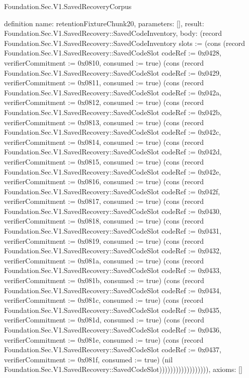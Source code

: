 \begin{lexlean}{Foundation.Sec.V1.SavedRecoveryCorpus}
\begin{semanticmodule}
definition{
  name: retentionFixtureChunk20,
  parameters: [],
  result: Foundation.Sec.V1.SavedRecovery::SavedCodeInventory,
  body: (record Foundation.Sec.V1.SavedRecovery::SavedCodeInventory {slots := (cons (record Foundation.Sec.V1.SavedRecovery::SavedCodeSlot {codeRef := 0x0428, verifierCommitment := 0x0810, consumed := true}) (cons (record Foundation.Sec.V1.SavedRecovery::SavedCodeSlot {codeRef := 0x0429, verifierCommitment := 0x0811, consumed := true}) (cons (record Foundation.Sec.V1.SavedRecovery::SavedCodeSlot {codeRef := 0x042a, verifierCommitment := 0x0812, consumed := true}) (cons (record Foundation.Sec.V1.SavedRecovery::SavedCodeSlot {codeRef := 0x042b, verifierCommitment := 0x0813, consumed := true}) (cons (record Foundation.Sec.V1.SavedRecovery::SavedCodeSlot {codeRef := 0x042c, verifierCommitment := 0x0814, consumed := true}) (cons (record Foundation.Sec.V1.SavedRecovery::SavedCodeSlot {codeRef := 0x042d, verifierCommitment := 0x0815, consumed := true}) (cons (record Foundation.Sec.V1.SavedRecovery::SavedCodeSlot {codeRef := 0x042e, verifierCommitment := 0x0816, consumed := true}) (cons (record Foundation.Sec.V1.SavedRecovery::SavedCodeSlot {codeRef := 0x042f, verifierCommitment := 0x0817, consumed := true}) (cons (record Foundation.Sec.V1.SavedRecovery::SavedCodeSlot {codeRef := 0x0430, verifierCommitment := 0x0818, consumed := true}) (cons (record Foundation.Sec.V1.SavedRecovery::SavedCodeSlot {codeRef := 0x0431, verifierCommitment := 0x0819, consumed := true}) (cons (record Foundation.Sec.V1.SavedRecovery::SavedCodeSlot {codeRef := 0x0432, verifierCommitment := 0x081a, consumed := true}) (cons (record Foundation.Sec.V1.SavedRecovery::SavedCodeSlot {codeRef := 0x0433, verifierCommitment := 0x081b, consumed := true}) (cons (record Foundation.Sec.V1.SavedRecovery::SavedCodeSlot {codeRef := 0x0434, verifierCommitment := 0x081c, consumed := true}) (cons (record Foundation.Sec.V1.SavedRecovery::SavedCodeSlot {codeRef := 0x0435, verifierCommitment := 0x081d, consumed := true}) (cons (record Foundation.Sec.V1.SavedRecovery::SavedCodeSlot {codeRef := 0x0436, verifierCommitment := 0x081e, consumed := true}) (cons (record Foundation.Sec.V1.SavedRecovery::SavedCodeSlot {codeRef := 0x0437, verifierCommitment := 0x081f, consumed := true}) (nil Foundation.Sec.V1.SavedRecovery::SavedCodeSlot)))))))))))))))))}),
  axioms: []
}


\end{semanticmodule}
\end{lexlean}
